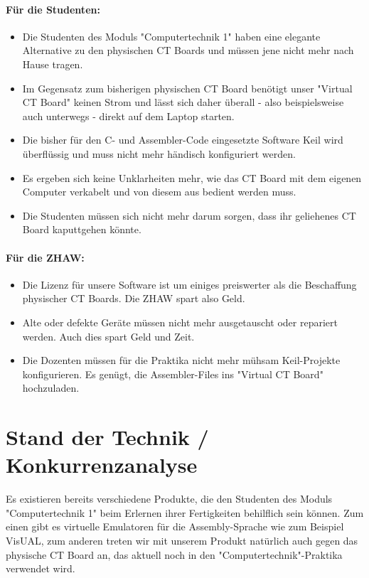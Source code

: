\documentclass[10pt]{article}
\begin{document}
\paragraph{Für die Studenten:}
\begin{itemize}
\item Die Studenten des Moduls "Computertechnik 1" haben eine elegante Alternative zu den physischen CT Boards und müssen jene nicht mehr nach Hause tragen.
\item Im Gegensatz zum bisherigen physischen CT Board benötigt unser "Virtual CT Board" keinen Strom und lässt sich daher überall - also beispielsweise auch unterwegs - direkt auf dem Laptop starten.
\item Die bisher für den C- und Assembler-Code eingesetzte Software Keil wird überflüssig und muss nicht mehr händisch konfiguriert werden.
\item Es ergeben sich keine Unklarheiten mehr, wie das CT Board mit dem eigenen Computer verkabelt und von diesem aus bedient werden muss.
\item Die Studenten müssen sich nicht mehr darum sorgen, dass ihr geliehenes CT Board kaputtgehen könnte.
\end{itemize}

\paragraph{Für die ZHAW:}
\begin{itemize}
\item Die Lizenz für unsere Software ist um einiges preiswerter als die Beschaffung physischer CT Boards. Die ZHAW spart also Geld.
\item Alte oder defekte Geräte müssen nicht mehr ausgetauscht oder repariert werden. Auch dies spart Geld und Zeit.
\item Die Dozenten müssen für die Praktika nicht mehr mühsam Keil-Projekte konfigurieren. Es genügt, die Assembler-Files ins "Virtual CT Board" hochzuladen.
\end{itemize}

\section{Stand der Technik / Konkurrenzanalyse}

Es existieren bereits verschiedene Produkte, die den Studenten des Moduls "Computertechnik 1" beim Erlernen ihrer Fertigkeiten behilflich sein können. Zum einen gibt es virtuelle Emulatoren für die Assembly-Sprache wie zum Beispiel VisUAL, zum anderen treten wir mit unserem Produkt natürlich auch gegen das physische CT Board an, das aktuell noch in den "Computertechnik"-Praktika verwendet wird.
\end{document}
